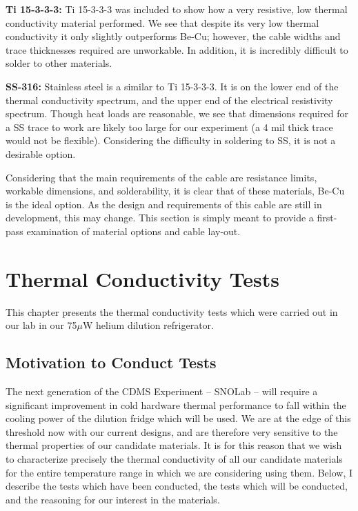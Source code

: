 \documentclass{report}
\begin{document}
\textbf{Ti 15-3-3-3:} Ti 15-3-3-3 was included to show how a very resistive, low thermal conductivity material performed. We see that despite its very low thermal conductivity it only slightly outperforms Be-Cu; however, the cable widths and trace thicknesses required are unworkable. In addition, it is incredibly difficult to solder to other materials.

\textbf{SS-316:} Stainless steel is a similar to Ti 15-3-3-3. It is on the lower end of the thermal conductivity spectrum, and the upper end of the electrical resistivity spectrum. Though heat loads are reasonable, we see that dimensions required for a SS trace to work are likely too large for our experiment (a 4 mil thick trace would not be flexible). Considering the difficulty in soldering to SS, it is not a desirable option.

Considering that the main requirements of the cable are resistance limits, workable dimensions, and solderability, it is clear that of these materials, Be-Cu is the ideal option. As the design and requirements of this cable are still in development, this may change. This section is simply meant to provide a first-pass examination of material options and cable lay-out.

\chapter{Thermal Conductivity Tests}

This chapter presents the thermal conductivity tests which were carried out in our lab in our 75$\mu$W helium dilution refrigerator.

\section{Motivation to Conduct Tests}
The next generation of the CDMS Experiment -- SNOLab -- will require a significant improvement in cold hardware thermal performance to fall within the cooling power of the dilution fridge which will be used. We are at the edge of this threshold now with our current designs, and are therefore very sensitive to the thermal properties of our candidate materials. It is for this reason that we wish to characterize precisely the thermal conductivity of all our candidate materials for the entire temperature range in which we are considering using them. Below, I describe the tests which have been conducted, the tests which will be conducted, and the reasoning for our interest in the materials.
\end{document}
